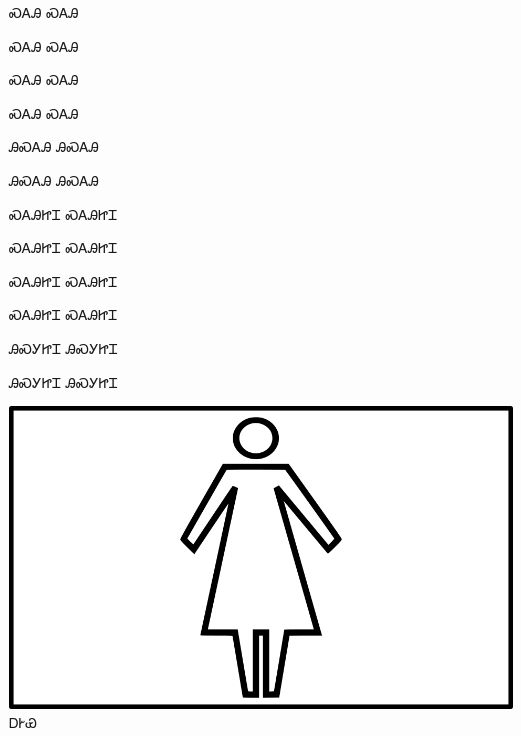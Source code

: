 \documentclass[avery5371]{flashcards}%
\begin{document}
\begin{flashcard}{\Huge ᏍᎪᎯ}
\Huge ᏍᎪᎯ
\end{flashcard}

\begin{flashcard}{\Huge ᏍᎪᎯ}
\Huge ᏍᎪᎯ
\end{flashcard}

\begin{flashcard}{\Huge ᏍᎪᎯ}
\Huge ᏍᎪᎯ
\end{flashcard}

\begin{flashcard}{\Huge ᏍᎪᎯ}
\Huge ᏍᎪᎯ
\end{flashcard}

\begin{flashcard}{\Huge ᎯᏍᎪᎯ}
\Huge ᎯᏍᎪᎯ
\end{flashcard}

\begin{flashcard}{\Huge ᎯᏍᎪᎯ}
\Huge ᎯᏍᎪᎯ
\end{flashcard}

\begin{flashcard}{\Huge ᏍᎪᎯᏥᏆ}
\Huge ᏍᎪᎯᏥᏆ
\end{flashcard}

\begin{flashcard}{\Huge ᏍᎪᎯᏥᏆ}
\Huge ᏍᎪᎯᏥᏆ
\end{flashcard}

\begin{flashcard}{\Huge ᏍᎪᎯᏥᏆ}
\Huge ᏍᎪᎯᏥᏆ
\end{flashcard}

\begin{flashcard}{\Huge ᏍᎪᎯᏥᏆ}
\Huge ᏍᎪᎯᏥᏆ
\end{flashcard}

\begin{flashcard}{\Huge ᎯᏍᎩᏥᏆ}
\Huge ᎯᏍᎩᏥᏆ
\end{flashcard}

\begin{flashcard}{\Huge ᎯᏍᎩᏥᏆ}
\Huge ᎯᏍᎩᏥᏆ
\end{flashcard}


\begin{flashcard}{
\includegraphics[width=0.95\columnwidth,height=.51\columnwidth,keepaspectratio]{../artwork/objects-animate/agehya}
}
\Huge ᎠᎨᏯ
\end{flashcard}
\end{document}
